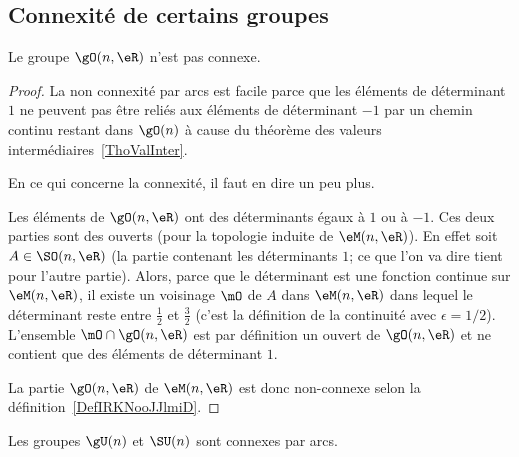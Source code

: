 \subsection{Connexité  de certains groupes}

\begin{lemma}           \label{LEMooIPOVooZJyNoH}
	Le groupe \( \gO(n,\eR)\) n'est pas connexe.
\end{lemma}

\begin{proof}
	La non connexité par arcs est facile parce que les éléments de déterminant \( 1\) ne peuvent pas être reliés aux éléments de déterminant \( -1\) par un chemin continu restant dans \( \gO(n)\) à cause du théorème des valeurs intermédiaires~\ref{ThoValInter}.

	En ce qui concerne la connexité, il faut en dire un peu plus.

	Les éléments de \( \gO(n,\eR)\) ont des déterminants égaux à \( 1\) ou à \( -1\). Ces deux parties sont des ouverts (pour la topologie induite de \( \eM(n,\eR)\)). En effet soit \( A\in\SO(n,\eR)\) (la partie contenant les déterminants \( 1\); ce que l'on va dire tient pour l'autre partie). Alors, parce que le déterminant est une fonction continue sur \( \eM(n,\eR)\), il existe un voisinage \( \mO\) de \( A\) dans \( \eM(n,\eR)\) dans lequel le déterminant reste entre \( \frac{ 1 }{2}\) et \( \frac{ 3 }{2}\) (c'est la définition de la continuité avec \( \epsilon=1/2\)). L'ensemble \( \mO\cap\gO(n,\eR)\) est par définition un ouvert de \( \gO(n,\eR)\) et ne contient que des éléments de déterminant \( 1\).

	La partie \( \gO(n,\eR)\) de \( \eM(n,\eR)\) est donc non-connexe selon la définition~\ref{DefIRKNooJJlmiD}.
\end{proof}

\begin{lemma}       \label{LEMooQMXHooZQozMK}
	Les groupes \( \gU(n)\) et \( \SU(n)\) sont connexes par arcs.
\end{lemma}

